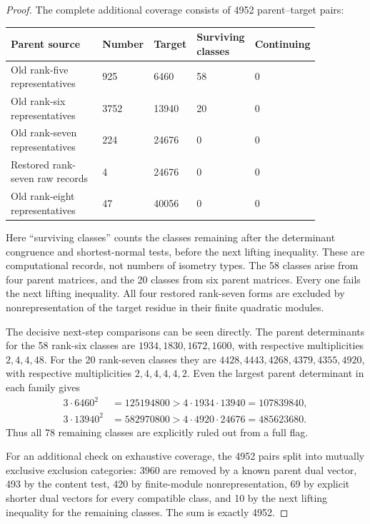 \begin{proof}
The complete additional coverage consists of 4952 parent--target pairs:
\begin{center}
\begin{tabular}{P{0.33\linewidth}P{0.10\linewidth}P{0.11\linewidth}P{0.18\linewidth}P{0.14\linewidth}}
\toprule
Parent source & Number & Target & Surviving classes & Continuing\\\midrule
Old rank-five representatives &925&6460&58&0\\
Old rank-six representatives &3752&13940&20&0\\
Old rank-seven representatives &224&24676&0&0\\
Restored rank-seven raw records &4&24676&0&0\\
Old rank-eight representatives &47&40056&0&0\\
\bottomrule
\end{tabular}
\end{center}
Here ``surviving classes'' counts the classes remaining after the determinant congruence and shortest-normal tests, before the next lifting inequality. These are computational records, not numbers of isometry types. The 58 classes arise from four parent matrices, and the 20 classes from six parent matrices. Every one fails the next lifting inequality. All four restored rank-seven forms are excluded by nonrepresentation of the target residue in their finite quadratic modules.

The decisive next-step comparisons can be seen directly. The parent determinants for the 58 rank-six classes are $1934,1830,1672,1600$, with respective multiplicities $2,4,4,48$. For the 20 rank-seven classes they are $4428,4443,4268,4379,4355,4920$, with respective multiplicities $2,4,4,4,4,2$. Even the largest parent determinant in each family gives
\[
\begin{aligned}
3\cdot6460^2&=125194800>4\cdot1934\cdot13940=107839840,\\
3\cdot13940^2&=582970800>4\cdot4920\cdot24676=485623680.
\end{aligned}
\]
Thus all 78 remaining classes are explicitly ruled out from a full flag.

For an additional check on exhaustive coverage, the 4952 pairs split into mutually exclusive exclusion categories: 3960 are removed by a known parent dual vector, 493 by the content test, 420 by finite-module nonrepresentation, 69 by explicit shorter dual vectors for every compatible class, and 10 by the next lifting inequality for the remaining classes. The sum is exactly 4952.


\end{proof}
